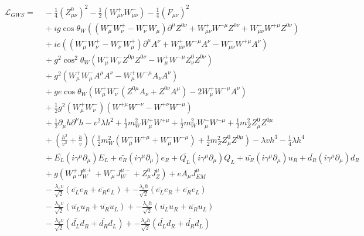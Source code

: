 \begin{equation}\label{eq:ewk_lagrangian_unbroken}
\begin{aligned}
\mathcal{L}_{GWS} = &~ -\frac{1}{4}(Z_{\mu\nu}^{0})^{2} -
\frac{1}{2}(W_{\mu\nu}^{+}W_{\mu\nu}^{-}) -
\frac{1}{4}(F_{\mu\nu})^{2}  \\
&~ + ig\cos{\theta_{W}}\left( (W_{\mu}^{-}W_{\nu}^{+} -
  W_{\nu}^{-}W_{\mu})\partial^{\mu}Z^{0\nu} +
  W_{\mu\nu}^{+}W^{-\mu}Z^{0\nu} + W_{\mu\nu}^{-}W^{+\mu}Z^{0\nu}
\right) \\ 
&~ + ie\left(
  (W_{\mu}^{-}W_{\nu}^{+}-W_{\nu}^{-}W_{\mu}^{+})\partial^{\mu}A^{\nu}
  + W_{\mu\nu}^{+}W^{-\mu}A^{\nu} - W_{\mu\nu}^{-}W^{+\mu}A^{\nu}
\right)\\
&~ + g^{2}\cos^{2}{\theta_{W}}\left(
  W_{\mu}^{+}W_{\nu}^{-}Z^{0\mu}Z^{0\nu} -
  W_{\mu}^{+}W^{-\mu}Z_{\nu}^{0}Z^{0\nu} \right) \\
&~ + g^{2}\left( W_{\mu}^{+}W_{\mu}^{-}A^{\mu}A^{\nu} -
  W_{\mu}^{+}W^{-\mu}A_{\nu}A^{\nu} \right) \\
&~ + ge\cos{\theta_{W}}\left( W_{\mu}^{+}W_{\nu}^{-}(Z^{0\mu}A_{\nu} +
  Z^{0\nu}A^{\mu}) - 2W_{\mu}^{+}W^{-\mu}A^{\nu} \right) \\
&~ + \frac{1}{2}g^{2}(W_{\mu}^{+}W_{\nu}^{-})(W^{+\mu}W^{-\nu} -
W^{+\nu}W^{-\mu}) \\
&~ + \frac{1}{2}\partial_{\mu}h\partial^{\nu}h - v^{2}{\lambda}h^{2} +
\frac{1}{2}m_{W}^{2}W_{\mu}^{+}W^{+\mu} +
\frac{1}{2}m_{W}^{2}W_{\mu}^{-}W^{-\mu} +
\frac{1}{2}m_{Z}^{2}Z_{\mu}^{0}Z^{0\mu} \\
&~ + (\frac{h^{2}}{v^{2}} + \frac{h}{v})\left(
  \frac{1}{2}m_{W}^{2}(W_{\mu}^{+}W^{+\mu} + W_{\mu}^{-}W^{-\mu}) +
  \frac{1}{2}m_{Z}^{2}Z_{\mu}^{0}Z^{0\mu} \right) - {\lambda}vh^{3} - \frac{1}{4}{\lambda}h^{4} \\
&~ + \bar{E_{L}}(i\gamma^{\mu}\partial_{\mu})E_{L} +
\bar{e_{R}}(i\gamma^{\mu}\partial_{\mu})e_{R} +
\bar{Q_{L}}(i\gamma^{\mu}\partial_{\mu})Q_{L} +
\bar{u_{R}}(i\gamma^{\mu}\partial_{\mu})u_{R}  +
\bar{d_{R}}(i\gamma^{\mu}\partial_{\mu})d_{R} \\ 
&~ + g(W_{\mu}^{+}J_{W}^{\mu+} + W_{\mu}^{-}J_{W}^{\mu-} +
Z_{\mu}^{0}J_{Z}^{\mu}) + eA_{\mu}J_{EM}^{\mu} \\
&~ -\frac{\lambda_{e}v}{\sqrt{2}}(\bar{e_{L}}e_{R}+\bar{e_{R}}e_{L}) +
-\frac{\lambda_{e}h}{\sqrt{2}}(\bar{e_{L}}e_{R}+\bar{e_{R}}e_{L}) \\
&~ -\frac{\lambda_{u}v}{\sqrt{2}}(\bar{u_{L}}u_{R}+\bar{u_{R}}u_{L}) +
-\frac{\lambda_{u}h}{\sqrt{2}}(\bar{u_{L}}u_{R}+\bar{u_{R}}u_{L})  \\
&~ -\frac{\lambda_{d}v}{\sqrt{2}}(\bar{d_{L}}d_{R}+\bar{d_{R}}d_{L}) +
-\frac{\lambda_{d}h}{\sqrt{2}}(\bar{d_{L}}d_{R}+\bar{d_{R}}d_{L})  \\
\end{aligned}
\end{equation}

